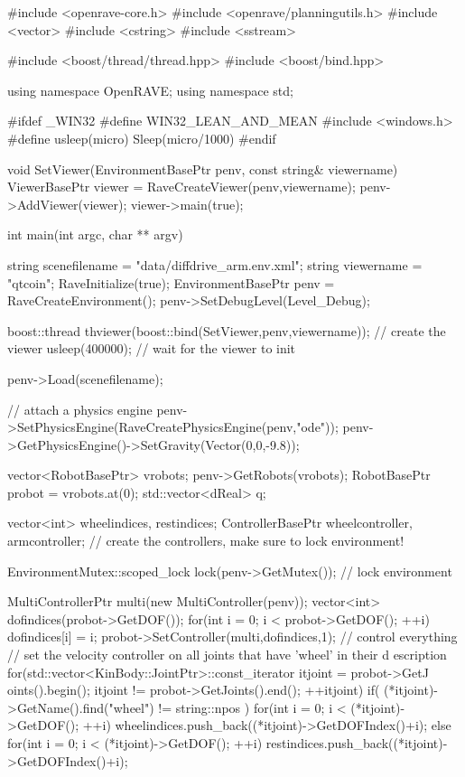 \begin{DoxyCodeInclude}

#include <openrave-core.h>
#include <openrave/planningutils.h>
#include <vector>
#include <cstring>
#include <sstream>

#include <boost/thread/thread.hpp>
#include <boost/bind.hpp>

using namespace OpenRAVE;
using namespace std;

#ifdef _WIN32
#define WIN32_LEAN_AND_MEAN
#include <windows.h>
#define usleep(micro) Sleep(micro/1000)
#endif

void SetViewer(EnvironmentBasePtr penv, const string& viewername)
{
    ViewerBasePtr viewer = RaveCreateViewer(penv,viewername);
    penv->AddViewer(viewer);
    viewer->main(true);
}

int main(int argc, char ** argv)
{
    string scenefilename = "data/diffdrive_arm.env.xml";
    string viewername = "qtcoin";
    RaveInitialize(true);
    EnvironmentBasePtr penv = RaveCreateEnvironment();
    penv->SetDebugLevel(Level_Debug);

    boost::thread thviewer(boost::bind(SetViewer,penv,viewername)); // create the
       viewer
    usleep(400000); // wait for the viewer to init

    penv->Load(scenefilename);

    // attach a physics engine
    penv->SetPhysicsEngine(RaveCreatePhysicsEngine(penv,"ode"));
    penv->GetPhysicsEngine()->SetGravity(Vector(0,0,-9.8));

    vector<RobotBasePtr> vrobots;
    penv->GetRobots(vrobots);
    RobotBasePtr probot = vrobots.at(0);
    std::vector<dReal> q;

    vector<int> wheelindices, restindices;
    ControllerBasePtr wheelcontroller, armcontroller;
    // create the controllers, make sure to lock environment!
    {
        EnvironmentMutex::scoped_lock lock(penv->GetMutex()); // lock environment
      

        MultiControllerPtr multi(new MultiController(penv));
        vector<int> dofindices(probot->GetDOF());
        for(int i = 0; i < probot->GetDOF(); ++i) {
            dofindices[i] = i;
        }
        probot->SetController(multi,dofindices,1); // control everything
        // set the velocity controller on all joints that have 'wheel' in their d
      escription
        for(std::vector<KinBody::JointPtr>::const_iterator itjoint = probot->GetJ
      oints().begin(); itjoint != probot->GetJoints().end(); ++itjoint) {
            if( (*itjoint)->GetName().find("wheel") != string::npos ) {
                for(int i = 0; i < (*itjoint)->GetDOF(); ++i) {
                    wheelindices.push_back((*itjoint)->GetDOFIndex()+i);
                }
            }
            else {
                for(int i = 0; i < (*itjoint)->GetDOF(); ++i) {
                    restindices.push_back((*itjoint)->GetDOFIndex()+i);
                }
            }
        }

}}
\end{DoxyCodeInclude}
